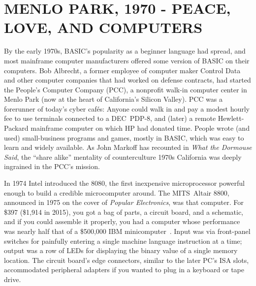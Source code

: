 
\section{MENLO PARK, 1970 - PEACE, LOVE, AND COMPUTERS}



By the early 1970s, BASIC's popularity as a beginner language had spread,
and most mainframe computer manufacturers offered some version of BASIC on their
computers.
Bob Albrecht, a former employee of computer maker Control Data and other
computer companies that had worked on defense contracts, had started the
People's Computer Company (PCC), a 
nonprofit walk-in computer center in Menlo Park (now at the heart of
California's Silicon Valley).  PCC was a forerunner of today's cyber caf\'{e}s:
Anyone could walk in and pay
a modest hourly fee to use terminals connected to a DEC~PDP-8, and (later)
a remote Hewlett-Packard
mainframe computer on which HP had donated time.
People wrote (and used) small-business programs and games, mostly in
BASIC, which 
was easy to learn and widely available.
As John Markoff has recounted in \emph{What the Dormouse Said}, the
``share alike'' mentality of counterculture 1970s California was
deeply ingrained in the PCC's mission.


In 1974 Intel introduced the 8080, the first inexpensive microprocessor powerful
enough to build a credible microcomputer around.  The MITS~Altair 8800,
announced in 1975 on the cover of \emph{Popular Electronics}, was
that computer.
For \$397 (\$1,914 in 2015), you got a bag of parts, a
circuit board, and a schematic, and if you could assemble it properly, you 
had a computer whose performance was nearly half that of a
\$500,000 IBM minicomputer~\cite{need_citation}.
Input was via
front-panel switches for painfully entering a
single machine language instruction at a time; output was a row of  LEDs for
displaying the binary value of a single memory location.  The circuit board's
edge connectors, similar to the later PC's ISA slots, accommodated 
peripheral adapters if you wanted to plug in a keyboard or tape drive.

